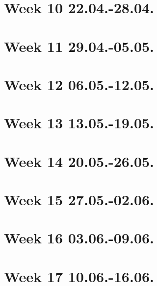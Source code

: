 \section{Week 10 22.04.-28.04.}
\section{Week 11 29.04.-05.05.}
\section{Week 12 06.05.-12.05.}
\section{Week 13 13.05.-19.05.}
\section{Week 14 20.05.-26.05.}
\section{Week 15 27.05.-02.06.}
\section{Week 16 03.06.-09.06.}
\section{Week 17 10.06.-16.06.}